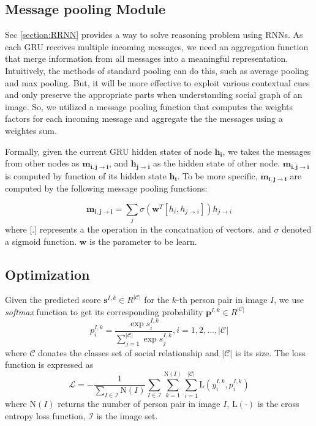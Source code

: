\documentclass{article}
\begin{document}
\subsection{Message pooling Module} \label{section:mp}

Sec \ref{section:RRNN} provides a way to solve reasoning problem using RNNs. As each GRU receives multiple incoming messages, we need an aggregation function that merge information from all messages into a meaningful representation. Intuitively, the methods of standard pooling  can do this, such as average pooling and max pooling. But, it will be more effective to exploit various contextual cues and only preserve the appropriate parts when understanding social graph of an image. So, we utilized a message pooling function that computes the weights factors for each incoming message and aggregate the the messages using a weightes sum. 

Formally, given the current GRU hidden states of node $\bm{h_i}$, we takes the messages from other nodes as $\bm{m_{i,j \to i}}$, and $\bm{h_{j \to i}}$ as the hidden state of other node. $\bm{m_{i,j \to i}}$ is computed by function of its hidden state $\bm{h_i}$. To be more specific, $\bm{m_{i, j \to i}}$ are computed by the following message pooling functions:

\begin{equation}
	\bm{m_{i,j \to i}} = \sum_{j} \sigma{(\bm{w}^T[h_i,h_{j \to i}])h_{j \to i}}	
\end{equation}
where [.] represents a the operation in the concatnation of vectors. and $\sigma$ denoted a sigmoid function. $\bm{w}$ is the parameter to be learn. 

\subsection{Optimization}

Given the predicted score $\mathbf{s}^{I,k} \in R^{|\mathcal{C}|}$ for the $k$-th person pair in image $I$, we use {\it softmax} function to get its corresponding probability $\mathbf{p}^{I,k} \in R^{|\mathcal{C}|}$
\begin{equation}
  \label{eq:prob_eq}
  p_i^{I,k} = \frac{\exp{s_i^{I,k}}}{\sum_{j=1}^{|\mathcal{C}|}{\exp{s_j^{I,k}}}}, i=1,2,\dots,|\mathcal{C}|
\end{equation}
where $\mathcal{C}$ donates the classes set of social relationship and $|\mathcal{C}|$ is its size. The loss function is expressed as
\begin{equation}
  \label{eq:loss_eq}
  \mathcal{L} = - \frac{1}{\sum_{I \in \mathcal{I}}\text{N}(I)} \sum_{I \in \mathcal{I}} \sum_{k=1}^{\text{N}(I)} \sum_{i=1}^{|\mathcal{C}|} \text{L}(y_{i}^{I,k}, p_{i}^{I,k})
\end{equation}
where $\text{N}(I)$ returns the number of person pair in image $I$, $\text{L}(\cdot)$ is the cross entropy loss function, $\mathcal{I}$ is the image set.
\end{document}
